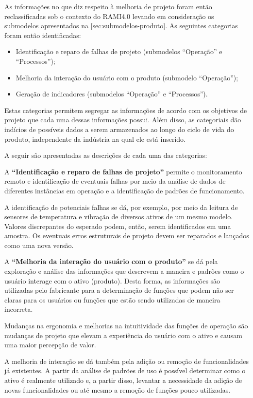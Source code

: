 As informações no que diz respeito à melhoria de projeto foram então reclassificadas sob o contexto do RAMI4.0 levando em consideração os submodelos apresentados na \autoref{sec:submodelos-produto}. As seguintes categorias foram então identificadas:

\begin{itemize}
	\item Identificação e reparo de falhas de projeto (submodelos ``Operação'' e ``Processos'');
	\item Melhoria da interação do usuário com o produto (submodelo ``Operação'');
	\item Geração de indicadores (submodelos ``Operação'' e ``Processos'').
\end{itemize}

Estas categorias permitem segregar as informações de acordo com os objetivos de projeto que cada uma dessas informações possui. Além disso, as categoriais dão indícios de possíveis dados a serem armazenados ao longo do ciclo de vida do produto, independente da indústria na qual ele está inserido.

A seguir são apresentadas as descrições de cada uma das categorias:

A \textbf{``Identificação e reparo de falhas de projeto''} permite o monitoramento remoto e identificação de eventuais falhas por meio da análise de dados de diferentes instâncias em operação e a identificação de padrões de funcionamento.

A identificação de potenciais falhas se dá, por exemplo, por meio da leitura de sensores de temperatura e vibração de diversos ativos de um mesmo modelo. Valores discrepantes do esperado podem, então, serem identificados em uma amostra. Os eventuais erros estruturais de projeto devem ser reparados e lançados como uma nova versão.

A \textbf{``Melhoria da interação do usuário com o produto''} se dá pela exploração e análise das informações que descrevem a maneira e padrões como o usuário interage com o ativo (produto). Desta forma, as informações são utilizadas pelo fabricante para a determinação de funções que podem não ser claras para os usuários ou funções que estão sendo utilizadas de maneira incorreta.

Mudanças na ergonomia e melhorias na intuitividade das funções de operação são mudanças de projeto que elevam a experiência do usuário com o ativo e causam uma maior percepção de valor.

A melhoria de interação se dá também pela adição ou remoção de funcionalidades já existentes. A partir da análise de padrões de uso é possível determinar como o ativo é realmente utilizado e, a partir disso, levantar a necessidade da adição de novas funcionalidades ou até mesmo a remoção de funções pouco utilizadas.

